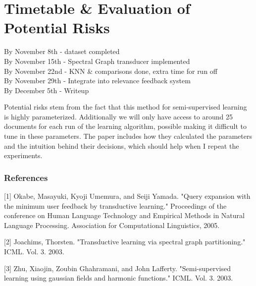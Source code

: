 \documentclass{article} %
\begin{document}
\section{Timetable \& Evaluation of Potential Risks}
By November 8th - dataset completed \\
By November 15th - Spectral Graph transducer implemented \\
By November 22nd - KNN \& comparisons done, extra time for run off \\
By November 29th - Integrate into relevance feedback system \\
By December 5th - Writeup

Potential risks stem from the fact that this method for semi-supervised learning is highly parameterized. Additionally we will only have access to around 25 documents for each run of the learning algorithm, possible making it difficult to tune in these parameters. The paper includes how they calculated the parameters and the intuition behind their decisions, which should help when I repeat the experiments.

\subsubsection*{References}
\small{
[1] Okabe, Masayuki, Kyoji Umemura, and Seiji Yamada. "Query expansion with the minimum user feedback by transductive learning." Proceedings of the conference on Human Language Technology and Empirical Methods in Natural Language Processing. Association for Computational Linguistics, 2005.

[2] Joachims, Thorsten. "Transductive learning via spectral graph partitioning." ICML. Vol. 3. 2003.

[3] Zhu, Xiaojin, Zoubin Ghahramani, and John Lafferty. "Semi-supervised learning using gaussian fields and harmonic functions." ICML. Vol. 3. 2003.
}
\end{document}
